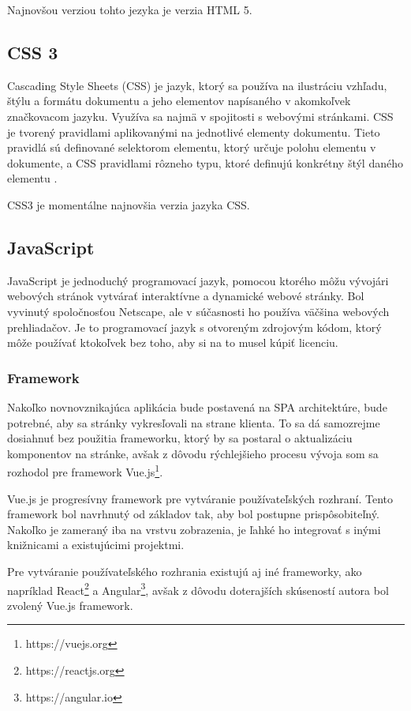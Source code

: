 Najnovšou verziou tohto jezyka je verzia HTML 5.

\subsection{CSS 3}
Cascading Style Sheets (CSS) je jazyk, ktorý sa používa na ilustráciu vzhľadu, štýlu a formátu dokumentu a jeho elementov napísaného v akomkoľvek značkovacom jazyku. Využíva sa najmä v spojitosti s webovými stránkami. CSS je tvorený pravidlami aplikovanými na jednotlivé elementy dokumentu. Tieto pravidlá sú definované selektorom elementu, ktorý určuje polohu elementu v dokumente, a CSS pravidlami rôzneho typu, ktoré definujú konkrétny štýl daného elementu \cite{co-je-css}. 

CSS3 je momentálne najnovšia verzia jazyka CSS.

\subsection{JavaScript}
JavaScript je jednoduchý programovací jazyk, pomocou ktorého môžu vývojári webových stránok vytvárať interaktívne a dynamické webové stránky. Bol vyvinutý spoločnosťou Netscape, ale v súčasnosti ho používa väčšina webových prehliadačov. Je to programovací jazyk s otvoreným zdrojovým kódom, ktorý môže používať ktokoľvek bez toho, aby si na to musel kúpiť licenciu.\cite{co-je-js}

\subsubsection*{Framework}
Nakoľko novnovznikajúca aplikácia bude postavená na SPA architektúre, bude potrebné, aby sa stránky vykresľovali na strane klienta. To sa dá samozrejme dosiahnuť bez použitia frameworku, ktorý by sa postaral o aktualizáciu komponentov na stránke, avšak z dôvodu rýchlejšieho procesu vývoja som sa rozhodol pre framework Vue.js\footnote{https://vuejs.org}.

Vue.js je progresívny framework pre vytváranie používateľských rozhraní. Tento framework bol navrhnutý od základov tak, aby bol postupne prispôsobiteľný. Nakoľko je zameraný iba na vrstvu zobrazenia, je ľahké ho integrovať s inými knižnicami a existujúcimi projektmi.\cite{co-je-vue}

Pre vytváranie používateľského rozhrania existujú aj iné frameworky, ako napríklad React\footnote{https://reactjs.org} a Angular\footnote{https://angular.io}, avšak z dôvodu doterajších skúseností autora bol zvolený Vue.js framework.

